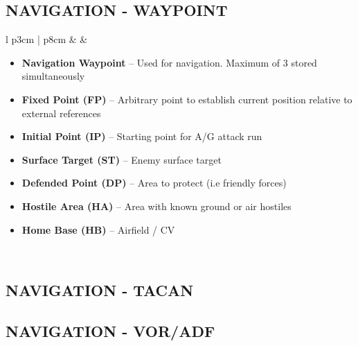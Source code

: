 \documentclass[8pt,usenames,dvipsnames,twoside]{article}
\begin{document}
	\subsection{NAVIGATION - WAYPOINT}
	\begin{center}
		\begin{longtable}{l p{3cm} | p{8cm}}
			\toprule
			\textbullet &   &
			\begin{minipage}[t]{\linewidth}
				\vspace{-7pt}
				\begin{itemize}
					\item \textbf{Navigation Waypoint} -- Used for navigation. Maximum of 3 stored simultaneously
					\item \textbf{Fixed Point (FP)} -- Arbitrary point to establish current position relative to external references
					\item \textbf{Initial Point (IP)} -- Starting point for A/G attack run
					\item \textbf{Surface Target (ST)} -- Enemy surface target
					\item \textbf{Defended Point (DP)} -- Area to protect (i.e friendly forces)
					\item \textbf{Hostile Area (HA)} -- Area with known ground or air hostiles
					\item \textbf{Home Base (HB)} -- Airfield / CV
				\end{itemize}
			\end{minipage} \\
			\bottomrule
		\end{longtable}
	\end{center}

	\subsection{NAVIGATION - TACAN}
	\subsection{NAVIGATION - VOR/ADF}



	\cleardoublepage
\end{document}
